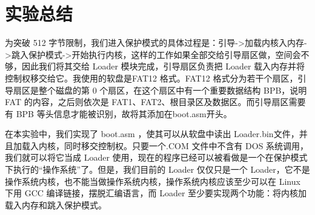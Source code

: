 \section{实验总结}
为突破 512 字节限制，我们进入保护模式的具体过程是：引导->加载内核入内存->跳入保护模式->开始执行内核，这样的工作如果全部交给引导扇区做，空间会不够，因此我们将其交给 Loader 模块完成，引导扇区负责把 Loader 载入内存并将控制权移交给它。我使用的软盘是FAT12 格式。FAT12 格式分为若干个扇区，引导扇区是整个磁盘的第 0 个扇区，在这个扇区中有一个重要数据结构 BPB，说明 FAT 的内容，之后则依次是 FAT1、FAT2、根目录区及数据区。而引导扇区需要有 BPB 等头信息才能被识别，故将其添加在boot.asm开头。\par
在本实验中，我们实现了 boot.asm ，使其可以从软盘中读出 Loader.bin文件，并且加载入内核，同时移交控制权。只要一个.COM 文件中不含有 DOS 系统调用，我们就可以将它当成 Loader 使用，现在的程序已经可以被看做是一个在保护模式下执行的“操作系统”了。但是，我们目前的 Loader 仅仅只是一个 Loader，它不是操作系统内核，也不能当做操作系统内核，操作系统内核应该至少可以在 Linux 下用 GCC 编译链接，摆脱汇编语言，而 Loader 至少要实现两个功能：将内核加载入内存和跳入保护模式。
